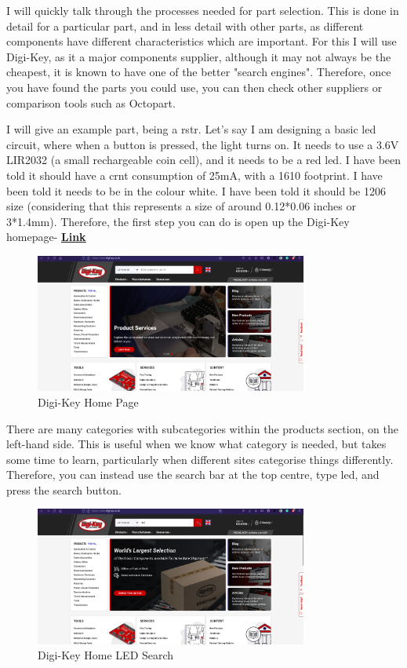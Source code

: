 \documentclass[a4paper,11pt]{report}
\let\oldhref\href %
\renewcommand{\href}[2]{\oldhref{#1}{\bfseries#2}}
\begin{document}
I will quickly talk through the processes needed for part selection. This is done in detail for a particular part, and in less detail with other parts, as different components have different characteristics which are important. For this I will use Digi-Key, as it a major components supplier, although it may not always be the cheapest, it is known to have one of the better "search engines". Therefore, once you have found the parts you could use, you can then check other suppliers or comparison tools such as Octopart.

I will give an example part, being a \gls{rstr}. Let's say I am designing a basic \gls{led} circuit, where when a button is pressed, the light turns on. It needs to use a 3.6V LIR2032 (a small rechargeable coin cell), and it needs to be a red \gls{led}. I have been told it should have a \gls{crnt} consumption of 25mA, with a  1610 footprint. I have been told it needs to be in the colour white. I have been told it should be 1206 size (considering that this represents a size of around 0.12*0.06 inches or 3*1.4mm).
Therefore, the first step you can do is open up the Digi-Key homepage- \href{https://www.DigiKey.co.uk/}{Link}

\begin{figure}[H]
\centering
\includegraphics[width=0.8\textwidth]{screenshots/DigiKeyHome}
\caption{Digi-Key Home Page}
\end{figure}

There are many categories with subcategories within the products section, on the left-hand side. This is useful when we know what category is needed, but takes some time to learn, particularly when different sites categorise things differently. Therefore, you can instead use the search bar at the top centre, type \gls{led}, and press the search button.

\begin{figure}[H]
\centering
\includegraphics[width=0.8\textwidth]{screenshots/DigiKeyHomeLEDSearch}
\caption{Digi-Key Home LED Search}
\end{figure}
\end{document}
